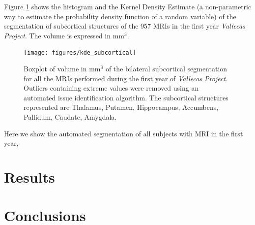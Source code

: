 \documentclass[11pt]{article}
\theoremstyle{definition}
\theoremstyle{remark}
\begin{document}
Figure \ref{fig:kde_subcortical} shows the histogram and the Kernel Density Estimate (a non-parametric way to estimate the probability density function of a random variable) of the segmentation of subcortical structures of the 957 MRIs in the first year \emph{Vallecas Project}. The volume is expressed in mm${^3}$.
\begin{figure}[H]
        \centering
        \texttt{[image: figures/kde\_subcortical]}
        \caption{Boxplot of volume in mm${^3}$ of the bilateral subcortical segmentation for all the MRIs performed during the first year of \emph{Vallecas Project}. Outliers containing extreme values were removed using an automated issue identification algorithm. The subcortical structures represented are Thalamus, Putamen, Hippocampus, Accumbens, Pallidum, Caudate, Amygdala.} 
        \label{fig:kde_subcortical}
\end{figure}



Here we show the automated segmentation of all subjects with MRI in the first year, 






\section{Results}
\label{se:res}



\section{Conclusions}
\label{se:con}

\newpage
{}



\end{document}
